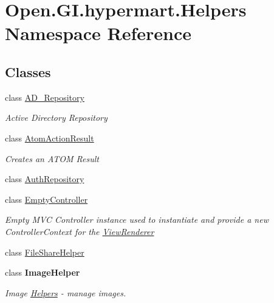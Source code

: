 \hypertarget{namespace_open_1_1_g_i_1_1hypermart_1_1_helpers}{}\section{Open.\+G\+I.\+hypermart.\+Helpers Namespace Reference}
\label{namespace_open_1_1_g_i_1_1hypermart_1_1_helpers}
\subsection*{Classes}
\begin{DoxyCompactItemize}
\item 
class \hyperlink{class_open_1_1_g_i_1_1hypermart_1_1_helpers_1_1_a_d___repository}{A\+D\+\_\+\+Repository}
\begin{DoxyCompactList}\small\item\em Active Directory Repository \end{DoxyCompactList}\item 
class \hyperlink{class_open_1_1_g_i_1_1hypermart_1_1_helpers_1_1_atom_action_result}{Atom\+Action\+Result}
\begin{DoxyCompactList}\small\item\em Creates an A\+T\+OM Result \end{DoxyCompactList}\item 
class \hyperlink{class_open_1_1_g_i_1_1hypermart_1_1_helpers_1_1_auth_repository}{Auth\+Repository}
\item 
class \hyperlink{class_open_1_1_g_i_1_1hypermart_1_1_helpers_1_1_empty_controller}{Empty\+Controller}
\begin{DoxyCompactList}\small\item\em Empty M\+VC Controller instance used to instantiate and provide a new Controller\+Context for the \hyperlink{class_open_1_1_g_i_1_1hypermart_1_1_helpers_1_1_view_renderer}{View\+Renderer} \end{DoxyCompactList}\item 
class \hyperlink{class_open_1_1_g_i_1_1hypermart_1_1_helpers_1_1_file_share_helper}{File\+Share\+Helper}
\item 
class {\bfseries Image\+Helper}
\begin{DoxyCompactList}\small\item\em Image \hyperlink{namespace_open_1_1_g_i_1_1hypermart_1_1_helpers}{Helpers} -\/ manage images. \end{DoxyCompactList}\item 

\end{DoxyCompactItemize}
